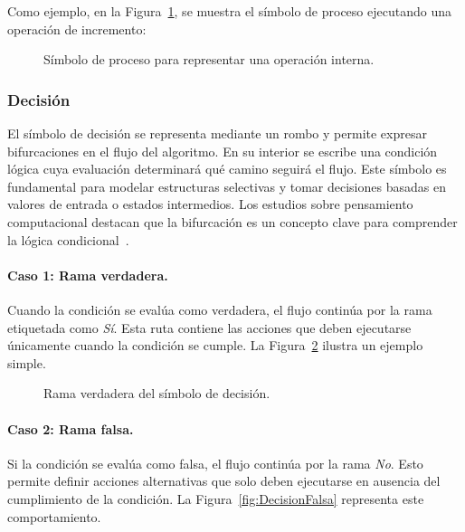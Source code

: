 \documentclass[12pt,twoside]{book}
\begin{document}
						Como ejemplo, en la Figura~\ref{fig:Proceso}, se muestra el símbolo de proceso ejecutando una operación de incremento:
						
						\begin{figure}[hbt!]
							\centering
							\caption{Símbolo de proceso para representar una operación interna.}
							\label{fig:Proceso}
						\end{figure}
						
					\subsubsection{Decisión}
						El símbolo de decisión se representa mediante un rombo y permite expresar bifurcaciones en el flujo del algoritmo. En su interior se escribe una condición lógica cuya evaluación determinará qué camino seguirá el flujo. Este símbolo es fundamental para modelar estructuras selectivas y tomar decisiones basadas en valores de entrada o estados intermedios. Los estudios sobre pensamiento computacional destacan que la bifurcación es un concepto clave para comprender la lógica condicional~\cite{Wing2006Computational,Perkovic2010Framework,Duckworth2025Computational}.
						
						\paragraph{Caso 1: Rama verdadera.}
						Cuando la condición se evalúa como verdadera, el flujo continúa por la rama etiquetada como \textit{Sí}. Esta ruta contiene las acciones que deben ejecutarse únicamente cuando la condición se cumple. La Figura~\ref{fig:DecisionVerdadera} ilustra un ejemplo simple.
						
						\begin{figure}[hbt!]
							\centering
							\caption{Rama verdadera del símbolo de decisión.}
							\label{fig:DecisionVerdadera}
						\end{figure}
						
						\paragraph{Caso 2: Rama falsa.}
						Si la condición se evalúa como falsa, el flujo continúa por la rama \textit{No}. Esto permite definir acciones alternativas que solo deben ejecutarse en ausencia del cumplimiento de la condición. La Figura~\ref{fig:DecisionFalsa} representa este comportamiento.
						
\end{document}
